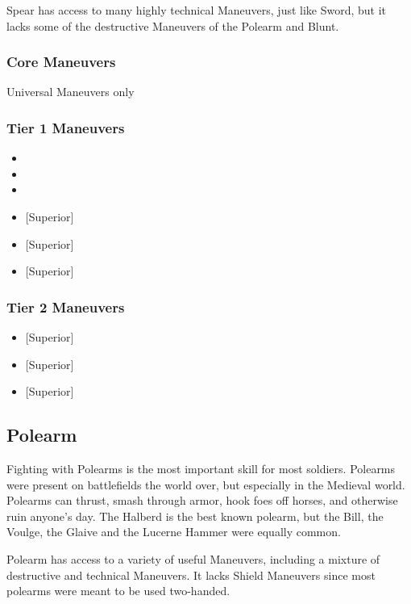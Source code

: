 \documentclass[oneside,11pt,english]{book}
\begin{document}
Spear has access to many highly technical Maneuvers, just like Sword, but it lacks some of the destructive Maneuvers of the Polearm and Blunt. 

\subsubsection{Core Maneuvers}
Universal Maneuvers only

\subsubsection{Tier 1 Maneuvers}
\vspace{-5pt}\begin{itemize}
	[itemsep=0.5mm]
	\item {}
	\item {}
	\item {}
	\item {} [Superior]
	\item {} [Superior]
	\item {} [Superior]
\end{itemize}
\subsubsection{Tier 2 Maneuvers}
\begin{itemize}
	[itemsep=0.5mm]
	\item {} [Superior] 
	\item {} [Superior] 
	\item {} [Superior]
\end{itemize}
\subsection{Polearm}
Fighting with Polearms is the most important skill for most soldiers. Polearms were present on 
battlefields the world over, but especially in the Medieval world. Polearms can thrust, smash through 
armor, hook foes off horses, and otherwise ruin anyone’s day. The Halberd is the best known polearm, 
but the Bill, the Voulge, the Glaive and the Lucerne Hammer were equally common. 

Polearm has access to a variety of useful Maneuvers, including a mixture of destructive and technical 
Maneuvers. It lacks Shield Maneuvers since most polearms were meant to be used two-handed. 
\end{document}
